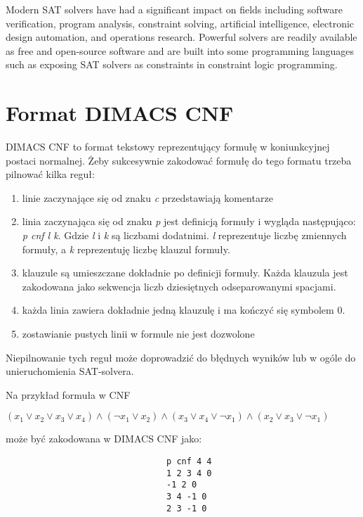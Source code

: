 \documentclass[a4paper,12pt,oneside]{book}
\theoremstyle{definition}
\begin{document}
Modern SAT solvers have had a significant impact on fields including software verification, program analysis, constraint solving, artificial intelligence, electronic design automation, and operations research. Powerful solvers are readily available as free and open-source software and are built into some programming languages such as exposing SAT solvers as constraints in constraint logic programming.

\section{Format DIMACS CNF}

DIMACS CNF to format tekstowy reprezentujący formułę w koniunkcyjnej postaci normalnej. Żeby sukcesywnie zakodować formułę do tego formatu trzeba pilnować kilka reguł: 

\begin{enumerate}
    \item linie zaczynające się od znaku \textit{c} przedstawiają komentarze
    \item linia zaczynająca się od znaku \textit{p} jest definicją formuły i wygląda następująco: \textit{p cnf l k}. Gdzie \textit{l} i \textit{k} są liczbami dodatnimi. \textit{l} reprezentuje liczbę zmiennych formuły, a \textit{k} reprezentuję liczbę klauzul formuły.
    \item klauzule są umieszczane dokładnie po definicji formuły. Każda klauzula jest zakodowana jako sekwencja liczb dziesiętnych odseparowanymi spacjami.
    \item każda linia zawiera dokładnie jedną klauzulę i ma kończyć się symbolem 0.
    \item zostawianie pustych linii w formule nie jest dozwolone
\end{enumerate}
Niepilnowanie tych reguł może doprowadzić do błędnych wyników lub w ogóle do unieruchomienia SAT-solvera.

Na przykład formuła w CNF

\begin{center}
    $(x_1 \lor x_2 \lor x_3 \lor x_4) \land (\neg x_1 \lor x_2) \land (x_3 \lor x_4 \lor \neg x_1) \land (x_2 \lor x_3 \lor \neg x_1)$ 
\end{center}

może być zakodowana w DIMACS CNF jako:

\begin{verbatim}
                                p cnf 4 4
                                1 2 3 4 0
                                -1 2 0
                                3 4 -1 0
                                2 3 -1 0
\end{verbatim}
\end{document}
